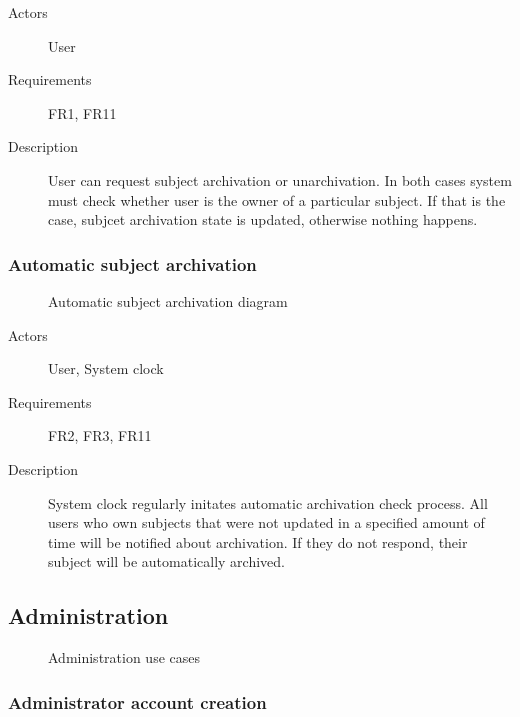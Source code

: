 \documentclass[
    english, %
]{VUMIFPSkursinis}
\begin{document}
\begin{description}
    \item[Actors] User
    \item[Requirements] FR1, FR11
    \item[Description] User can request subject archivation or unarchivation. In both cases system must check whether user is the owner of a particular subject. If that is the case, subjcet archivation state is updated, otherwise nothing happens.
\end{description}

\subsubsection{Automatic subject archivation}

\begin{figure}[ht]
    \centering
    
    \label{automatic-archivation-use-case}
    \caption{Automatic subject archivation diagram}
\end{figure}

\begin{description}
    \item[Actors] User, System clock
    \item[Requirements] FR2, FR3, FR11
    \item[Description] System clock regularly initates automatic archivation check process. All users who own subjects that were not updated in a specified amount of time will be notified about archivation. If they do not respond, their subject will be automatically archived.
\end{description}

\subsection{Administration}

\begin{figure}[ht]
    \centering
    
    \label{administration-use-cases}
    \caption{Administration use cases}
\end{figure}

\subsubsection{Administrator account creation}
\end{document}

